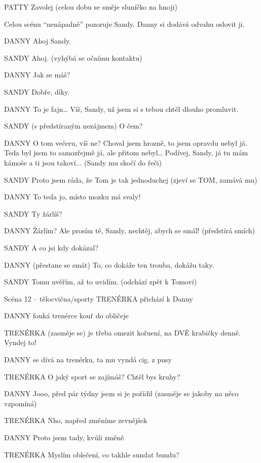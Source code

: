 PATTY         Zavolej (celou dobu se směje sluníčko na hnoji) 

Celou scénu “nenápadně” pozoruje Sandy. Danny si dodává odvahu oslovit ji. 

DANNY         Ahoj Sandy.

SANDY        Ahoj. (vyhýbá se očnímu kontaktu) 

DANNY        Jak se máš? 

SANDY        Dobře, díky. 

DANNY        To je fajn… Víš, Sandy, už jsem si s tebou chtěl dlouho promluvit. 

SANDY         (s předstíraným nezájmem) O čem? 

DANNY         O tom večeru, víš ne? Choval jsem hrozně, to jsem opravdu nebyl já.         Teda byl jsem to samozřejmě já, ale přitom nebyl… Podívej, Sandy, já tu         mám kámoše a ti jsou takoví... (Sandy mu skočí do řeči) 

SANDY        Proto jsem ráda, že Tom je tak jednoduchej (zjeví se TOM, zamává  mu) 

DANNY         To teda jo, místo mozku má svaly! 

SANDY         Ty žárlíš? 

DANNY        Žárlím? Ale prosím tě, Sandy, nechtěj, abych se smál! (předstírá smích) 

SANDY         A co jsi kdy dokázal? 

DANNY         (přestane se smát) To, co dokáže ten trouba, dokážu taky. 

SANDY        Tomu uvěřím, až to uvidím. (odchází zpět k Tomovi) 

Scéna 12 – tělocvična/sporty TRENÉRKA        přichází k Danny 

DANNY        fouká trenérce kouř do obličeje

TRENÉRKA        (zasměje se) je třeba omezit kořuení, na DVĚ krabičky denně. Vyndej to!

DANNY        se dívá na trenérku, ta mu vyndá cig. z pusy 

TRENÉRKA        O jaký sport se zajímáš? Chtěl bys kruhy?

DANNY        Jooo, před pár týdny jsem si je pořídil (zasměje se jakoby na něco                 vzpomíná)

TRENÉRKA        Nho, napřed změníme zevnějšek

DANNY        Proto jsem tady, kvůli změně 

TRENÉRKA        Myslím oblečení, co takhle sundat bundu?  

